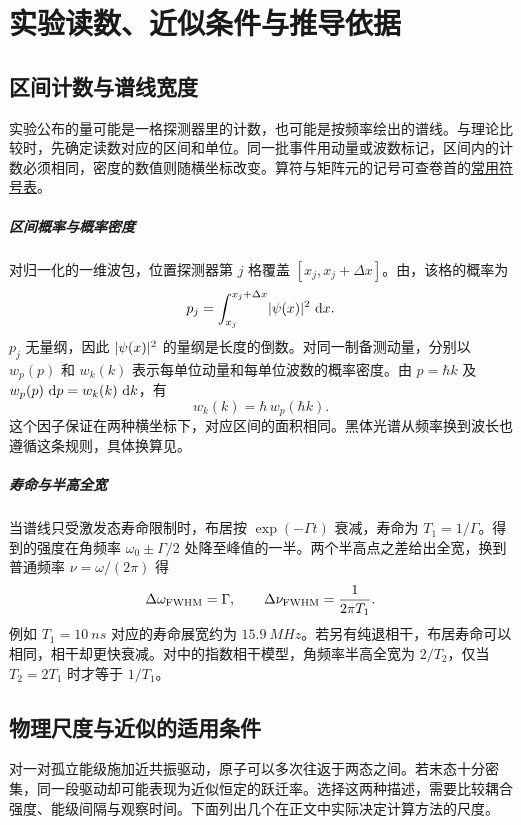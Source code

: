 \chapter{实验读数、近似条件与推导依据}
\label{app:checks}

\section{区间计数与谱线宽度}
实验公布的量可能是一格探测器里的计数，也可能是按频率绘出的谱线。与理论比较时，先确定读数对应的区间和单位。同一批事件用动量或波数标记，区间内的计数必须相同，密度的数值则随横坐标改变。算符与矩阵元的记号可查卷首的\hyperref[chap:symbols]{常用符号表}。

\paragraph*{区间概率与概率密度}
对归一化的一维波包，位置探测器第 $j$ 格覆盖 $[x_j,x_j + \Delta x]$。由，该格的概率为
\[
    p_j = \int_{x_j}^{x_j+\Delta x}\lvert\psi(x)\rvert^2\,\mathop{}\!\mathrm{d} x .
\]
$p_j$ 无量纲，因此 $\lvert\psi(x)\rvert^2$ 的量纲是长度的倒数。对同一制备测动量，分别以 $w_p(p)$ 和 $w_k(k)$ 表示每单位动量和每单位波数的概率密度。由 $p = \hbar k$ 及 $w_p(p)\,\mathop{}\!\mathrm{d} p = w_k(k)\,\mathop{}\!\mathrm{d} k$，有
\[
    w_k(k) = \hbar\,w_p(\hbar k).
\]
这个因子保证在两种横坐标下，对应区间的面积相同。黑体光谱从频率换到波长也遵循这条规则，具体换算见。

\paragraph*{寿命与半高全宽}
当谱线只受激发态寿命限制时，布居按 $\exp(-\Gamma t)$ 衰减，寿命为 $T_1 = 1/\Gamma$。得到的强度在角频率 $\omega_0 \pm \Gamma/2$ 处降至峰值的一半。两个半高点之差给出全宽，换到普通频率 $\nu = \omega/(2\pi)$ 得
\begin{equation}\label{eq:qm-lifetime-linewidth}
    \Delta\omega_{\mathrm{FWHM}} = \Gamma,
    \qquad \Delta\nu_{\mathrm{FWHM}} = \frac{1}{2\pi T_1}.
\end{equation}
例如 $T_1 = \qty{10}{ns}$ 对应的寿命展宽约为 $\qty{15.9}{MHz}$。若另有纯退相干，布居寿命可以相同，相干却更快衰减。对中的指数相干模型，角频率半高全宽为 $2/T_2$，仅当 $T_2 = 2T_1$ 时才等于 $1/T_1$。

\section{物理尺度与近似的适用条件}
对一对孤立能级施加近共振驱动，原子可以多次往返于两态之间。若末态十分密集，同一段驱动却可能表现为近似恒定的跃迁率。选择这两种描述，需要比较耦合强度、能级间隔与观察时间。下面列出几个在正文中实际决定计算方法的尺度。

